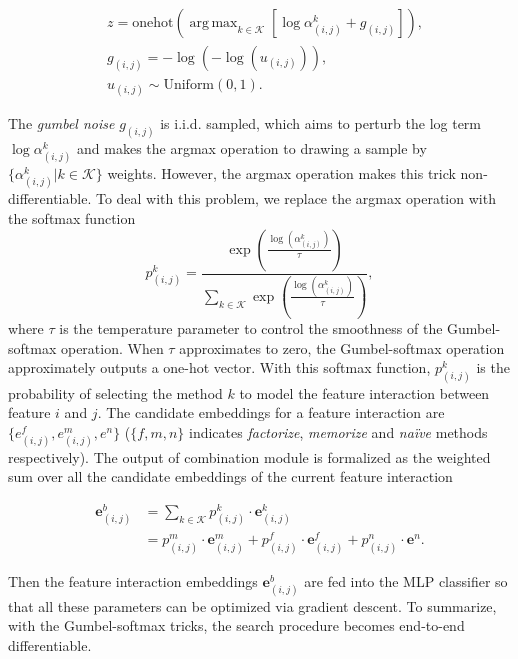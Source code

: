 \documentclass[conference]{IEEEtran}
\DeclareMathOperator*{\argmax}{arg\,max}
\begin{document}
\begin{equation}
\begin{split}
    & z = \text{onehot} \left(\argmax_{k \in \mathcal{K}} [ \log \alpha^k_{(i,j)} + g_{(i,j)} ] \right), \\
    & g_{(i,j)} = -\log(-\log(u_{(i,j)})), \\
    & u_{(i,j)} \sim \text{Uniform}(0,1).
\end{split}
\end{equation}

The \textit{gumbel noise} $g_{(i,j)}$ is i.i.d. sampled, which aims to perturb the log term $\log \alpha_{(i,j)}^k$ and makes the argmax operation  to drawing a sample by $\{\alpha_{(i,j)}^k | k \in \mathcal{K}\}$ weights. However, the argmax operation makes this trick non-differentiable. To deal with this problem, we replace the argmax operation with the softmax function
\begin{equation}
    p^k_{(i,j)} = \frac{\exp(\frac{\log(\alpha^k_{(i,j)})}{\tau})}{\sum_{k \in \mathcal{K}}\exp(\frac{\log(\alpha^k_{(i,j)})}{\tau})},
\end{equation}
where $\tau$ is the temperature parameter to control the smoothness of the Gumbel-softmax operation. When $\tau$ approximates to zero, the Gumbel-softmax operation approximately outputs a one-hot vector. With this softmax function, $p_{(i,j)}^k$ is the probability of selecting the method $k$ to model the feature interaction between feature $i$ and $j$. 
The candidate embeddings for a feature interaction are $\{e^{f}_{(i,j)}, e^{m}_{(i,j)}, e^{n}\}$ ($\{f,m,n\}$ indicates \emph{factorize}, \emph{memorize} and \emph{naïve} methods respectively). The output of combination module is formalized as the weighted sum over all the candidate embeddings of the current feature interaction 

\begin{equation}
\begin{split}
    \mathbf{e}^{b}_{(i,j)} &= \sum_{k \in \mathcal{K}} p^k_{(i,j)} \cdot \mathbf{e}^k_{(i,j)}  \\
    &= p^{m}_{(i,j)} \cdot \mathbf{e}^{m}_{(i,j)} + p^{f}_{(i,j)} \cdot \mathbf{e}^{f}_{(i,j)} +  p^{n}_{(i,j)} \cdot \mathbf{e}^{n}.
\end{split}
\end{equation}

Then the feature interaction embeddings $\mathbf{e}^{b}_{(i,j)}$ are fed into the MLP classifier so that all these parameters can be optimized via gradient descent. To summarize, with the Gumbel-softmax tricks, the search procedure becomes end-to-end differentiable.
\end{document}
